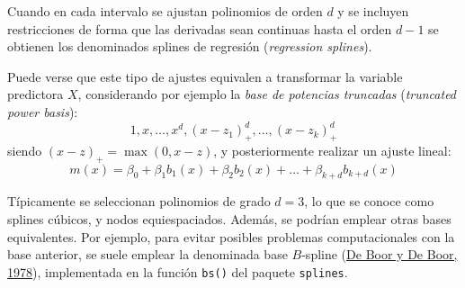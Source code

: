 \documentclass[
  spanish,
]{book}
\theoremstyle{break}
\theoremstyle{definition}
\theoremstyle{definition}
\theoremstyle{definition}
\theoremstyle{definition}
\theoremstyle{remark}
\begin{document}
Cuando en cada intervalo se ajustan polinomios de orden \(d\) y se incluyen restricciones de forma que las derivadas sean continuas hasta el orden \(d-1\) se obtienen los denominados splines de regresión (\emph{regression splines}).

Puede verse que este tipo de ajustes equivalen a transformar la variable predictora \(X\), considerando por ejemplo la \emph{base de potencias truncadas} (\emph{truncated power basis}):
\[1, x, \ldots, x^d, (x-z_1)_+^d,\ldots,(x-z_k)_+^d\]
siendo \((x - z)_+ = \max(0, x - z)\), y posteriormente realizar un ajuste lineal:
\[m(x) = \beta_0 + \beta_1 b_1(x) +  \beta_2 b_2(x) + \ldots  + \beta_{k+d} b_{k+d}(x)\]

Típicamente se seleccionan polinomios de grado \(d=3\), lo que se conoce como splines cúbicos, y nodos equiespaciados.
Además, se podrían emplear otras bases equivalentes. Por ejemplo, para evitar posibles problemas computacionales con la base anterior, se suele emplear la denominada base \(B\)-spline (\protect\hyperlink{ref-de1978practical}{De Boor y De Boor, 1978}), implementada en la función \texttt{bs()} del paquete \texttt{splines}.
\end{document}

